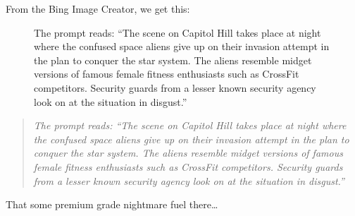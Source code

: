 From the Bing Image Creator, we get this:

\begin{figure}
\centering
{}
\caption{The prompt reads: ``The scene on Capitol Hill takes place at
night where the confused space aliens give up on their invasion attempt
in the plan to conquer the star system. The aliens resemble midget
versions of famous female fitness enthusiasts such as CrossFit
competitors. Security guards from a lesser known security agency look on
at the situation in disgust.''}
\end{figure}

\begin{quote}
\emph{The prompt reads: ``The scene on Capitol Hill takes place at night
where the confused space aliens give up on their invasion attempt in the
plan to conquer the star system. The aliens resemble midget versions of
famous female fitness enthusiasts such as CrossFit competitors. Security
guards from a lesser known security agency look on at the situation in
disgust.''}
\end{quote}

That some premium grade nightmare fuel there\ldots{}
